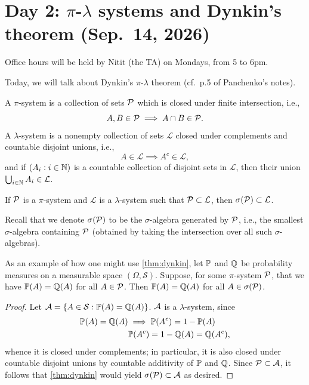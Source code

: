 \section{Day 2: \texorpdfstring{$\pi$}{pi}-\texorpdfstring{$\lambda$}{lambda} systems and Dynkin's theorem (Sep.\ 14, 2026)}
{\color{crimson} Office hours will be held by Nitit (the TA) on Mondays, from 5 to 6pm.}

Today, we will talk about Dynkin's $\pi$-$\lambda$ theorem (cf.\ p.5 of Panchenko's notes).
\begin{definition} \label{defn:pi_lambda_system}
    A $\pi$-system is a collection of sets $\mathcal P$ which is closed under finite intersection, i.e.,
    \[ A, B \in \mathcal P \implies A \cap B \in \mathcal P. \]
    A $\lambda$-system is a nonempty collection of sets $\mathcal L$ closed under complements and countable disjoint unions, i.e.,
    \[ A \in \mathcal L \implies A^c \in \mathcal L, \]
    and if $(A_i : i \in \mathbb N)$ is a countable collection of disjoint sets in $\mathcal L$, then their union $\bigcup_{i \in \mathbb N} A_i \in \mathcal L$.
\end{definition}

\begin{theorem}[Dynkin] \label{thm:dynkin}
    If $\mathcal P$ is a $\pi$-system and $\mathcal L$ is a $\lambda$-system such that $\mathcal P \subset \mathcal L$, then $\sigma(\mathcal P) \subset \mathcal L$.
\end{theorem}
Recall that we denote $\sigma(\mathcal P)$ to be the $\sigma$-algebra generated by $\mathcal P$, i.e., the smallest $\sigma$-algebra containing $\mathcal P$ (obtained by taking the intersection over all such $\sigma$-algebras).

As an example of how one might use \ref{thm:dynkin}, let $\mathbb P$ and $\mathbb Q$ be probability measures on a measurable space $(\Omega, \mathcal S)$. Suppose, for some $\pi$-system $\mathcal P$, that we have $\mathbb P(A) = \mathbb Q(A)$ for all $A \in \mathcal P$. Then $\mathbb P(A) = \mathbb Q(A)$ for all $A \in \sigma(\mathcal P)$.

\begin{proof}
    Let $\mathcal A = \{A \in \mathcal S : \mathbb P(A) = \mathbb Q(A)\}$. $\mathcal A$ is a $\lambda$-system, since
    \begin{align*}
        \mathbb P(A) = \mathbb Q(A) &\implies \mathbb P(A^c) = 1 - \mathbb P(A) \\
        &\mathbb P(A^c) = 1 - \mathbb Q(A) = \mathbb Q(A^c),
    \end{align*}
    whence it is closed under complements; in particular, it is also closed under countable disjoint unions by countable additivity of $\mathbb P$ and $\mathbb Q$. Since $\mathcal P \subset \mathcal A$, it follows that \ref{thm:dynkin} would yield $\sigma(\mathcal P) \subset \mathcal A$ as desired.
\end{proof}

